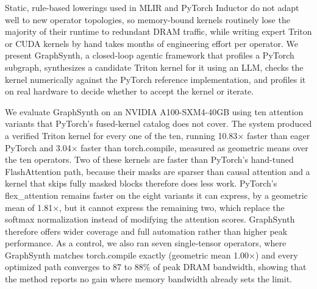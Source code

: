 \documentclass[10pt,twocolumn]{article}
\newcommand{\tc}{torch.compile}
\newcommand{\fx}{flex\_attention}
\begin{document}
\twocolumn[
\begin{@twocolumnfalse}
\vspace*{2pt}
\begin{center}
{\large\bfseries GraphSynth: Autonomous Optimization of PyTorch Execution Graphs via\\
Search-Guided Compiler Pass \& Triton Kernel Synthesis\par}
\vspace{10pt}
\end{center}
\vspace{2pt}
\end{@twocolumnfalse}
]

\vspace{3pt}

\noindent
Static, rule-based lowerings used in MLIR and PyTorch Inductor do not adapt well to
new operator topologies, so memory-bound kernels routinely lose the majority of their
runtime to redundant DRAM traffic, while writing expert Triton or CUDA kernels by hand
takes months of engineering effort per operator. We present GraphSynth, a closed-loop
agentic framework that profiles a PyTorch subgraph, synthesizes a candidate Triton
kernel for it using an LLM, checks the kernel numerically against the PyTorch
reference implementation, and profiles it on real hardware to decide whether to accept
the kernel or iterate.

We evaluate GraphSynth on an NVIDIA A100-SXM4-40GB using ten attention variants that
PyTorch's fused-kernel catalog does not cover. The system produced a verified Triton
kernel for every one of the ten, running 10.83$\times$ faster than eager PyTorch and
3.04$\times$ faster than \tc{}, measured as geometric means over the ten operators. Two
of these kernels are faster than PyTorch's hand-tuned FlashAttention path, because their
masks are sparser than causal attention and a kernel that skips fully masked blocks
therefore does less work. PyTorch's \fx{} remains faster on the eight variants it can
express, by a geometric mean of 1.81$\times$, but it cannot express the remaining two,
which replace the softmax normalization instead of modifying the attention scores.
GraphSynth therefore offers wider coverage and full automation rather than higher peak
performance. As a control, we also ran seven single-tensor operators, where GraphSynth
matches \tc{} exactly (geometric mean 1.00$\times$) and every optimized path converges to
87 to 88\% of peak DRAM bandwidth, showing that the method reports no gain where memory bandwidth
already sets the limit.
\end{document}
